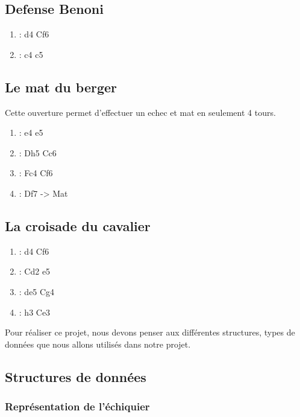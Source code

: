 \documentclass[12pt]{article}
\begin{document}
\subsection{Defense Benoni}\label{defense-benoni}

\begin{enumerate}
\def\labelenumi{\arabic{enumi}.}
\itemsep1pt\parskip0pt
\item
  : d4 Cf6
\item
  : c4 c5
\end{enumerate}

\subsection{Le mat du berger}\label{le-mat-du-berger}

Cette ouverture permet d'effectuer un echec et mat en seulement 4 tours.

\begin{enumerate}
\def\labelenumi{\arabic{enumi}.}
\itemsep1pt\parskip0pt
\item
  : e4 e5
\item
  : Dh5 Cc6
\item
  : Fc4 Cf6
\item
  : Df7 -\textgreater{} Mat
\end{enumerate}

\subsection{La croisade du cavalier}\label{la-croisade-du-cavalier}

\begin{enumerate}
\def\labelenumi{\arabic{enumi}.}
\itemsep1pt\parskip0pt
\item
  : d4 Cf6
\item
  : Cd2 e5
\item
  : de5 Cg4
\item
  : h3 Ce3 
\end{enumerate}

Pour réaliser ce projet, nous devons penser aux différentes structures,
types de données que nous allons utilisés dans notre projet.

\subsection{Structures de données}\label{structures-de-donnuxe9es}

\subsubsection{Représentation de
l'échiquier}\label{repruxe9sentation-de-luxe9chiquier}
\end{document}
